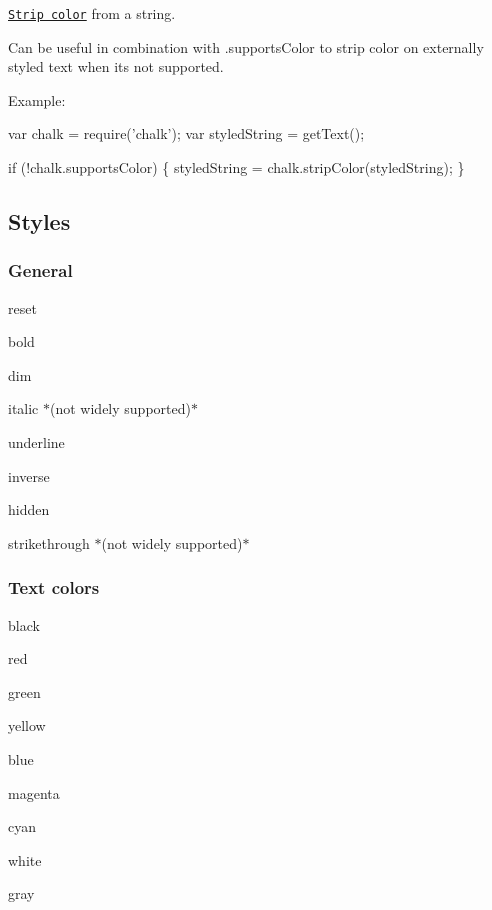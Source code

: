 \href{https://github.com/sindresorhus/strip-ansi}{\tt Strip color} from a string.

Can be useful in combination with {\ttfamily .supports\+Color} to strip color on externally styled text when it\textquotesingle{}s not supported.

Example\+:


\begin{DoxyCode}
var chalk = require('chalk');
var styledString = getText();

if (!chalk.supportsColor) \{
    styledString = chalk.stripColor(styledString);
\}
\end{DoxyCode}


\subsection*{Styles}

\subsubsection*{General}


\begin{DoxyItemize}
\item {\ttfamily reset}
\item {\ttfamily bold}
\item {\ttfamily dim}
\item {\ttfamily italic} $\ast$(not widely supported)$\ast$
\item {\ttfamily underline}
\item {\ttfamily inverse}
\item {\ttfamily hidden}
\item {\ttfamily strikethrough} $\ast$(not widely supported)$\ast$
\end{DoxyItemize}

\subsubsection*{Text colors}


\begin{DoxyItemize}
\item {\ttfamily black}
\item {\ttfamily red}
\item {\ttfamily green}
\item {\ttfamily yellow}
\item {\ttfamily blue}
\item {\ttfamily magenta}
\item {\ttfamily cyan}
\item {\ttfamily white}
\item {\ttfamily gray}
\end{DoxyItemize}

